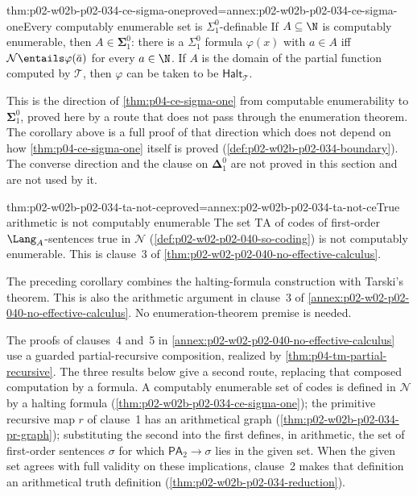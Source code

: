 \begin{hbcorollary}{thm:p02-w02b-p02-034-ce-sigma-one}{proved=annex:p02-w02b-p02-034-ce-sigma-one}{Every computably enumerable set is \(\Sigma^0_1\)-definable}
If \(A\subseteq\N\) is computably enumerable, then
\(A\in\boldsymbol\Sigma^0_1\): there is a \(\Sigma^0_1\) formula
\(\varphi(x)\) with \(a\in A\) iff \(\mathcal N\entails\varphi(\bar a)\) for
every \(a\in\N\).  If \(A\) is the domain of the partial function computed
by \(\mathcal T\), then \(\varphi\) can be taken to be
\(\mathsf{Halt}_{\mathcal T}\).
\end{hbcorollary}

This is the direction of \cref{thm:p04-ce-sigma-one} from computable
enumerability to \(\boldsymbol\Sigma^0_1\), proved here by a route that does
not pass through the enumeration theorem.  The corollary
above is a full proof of that direction which does not depend on how
\cref{thm:p04-ce-sigma-one} itself is proved
(\cref{def:p02-w02b-p02-034-boundary}).  The converse direction and the clause on
\(\boldsymbol\Delta^0_1\) are not proved in this section and are not used by
it.

\begin{hbcorollary}{thm:p02-w02b-p02-034-ta-not-ce}{proved=annex:p02-w02b-p02-034-ta-not-ce}{True arithmetic is not computably enumerable}
The set \(\mathrm{TA}\) of codes of first-order \(\Lang_A\)-sentences true in
\(\mathcal N\) (\cref{def:p02-w02-p02-040-so-coding}) is not computably
enumerable.  This is clause~3 of
\cref{thm:p02-w02-p02-040-no-effective-calculus}.
\end{hbcorollary}

The preceding corollary combines the halting-formula construction
with Tarski's theorem. This is also the arithmetic argument in
clause~3 of \cref{annex:p02-w02-p02-040-no-effective-calculus}.
No enumeration-theorem premise is needed.

The proofs of clauses~4 and~5 in
\cref{annex:p02-w02-p02-040-no-effective-calculus} use a guarded
partial-recursive composition, realized by
\cref{thm:p04-tm-partial-recursive}. The three results below give a
second route, replacing that composed computation by a formula.  A computably enumerable set of codes is
defined in \(\mathcal N\) by a halting formula
(\cref{thm:p02-w02b-p02-034-ce-sigma-one}); the primitive recursive map
\(r\) of clause~1 has an arithmetical graph
(\cref{thm:p02-w02b-p02-034-pr-graph}); substituting the second into the
first defines, in arithmetic, the set of first-order sentences \(\sigma\)
for which \(\mathsf{PA}_2\to\sigma\) lies in the given set.  When the given
set agrees with full validity on these implications, clause~2 makes that
definition an arithmetical truth definition
(\cref{thm:p02-w02b-p02-034-reduction}).

